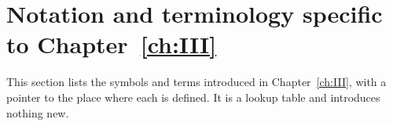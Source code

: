\endgroup
\begingroup
\providecommand{\A}{}\renewcommand{\A}{\mathbb A}
\providecommand{\C}{}\renewcommand{\C}{\mathbb C}
\providecommand{\Z}{}\renewcommand{\Z}{\mathbb Z}
\providecommand{\GL}{}\renewcommand{\GL}{\operatorname{GL}}
\providecommand{\Nrd}{}\renewcommand{\Nrd}{\operatorname{Nrd}}
\providecommand{\Irr}{}\renewcommand{\Irr}{\operatorname{Irr}}
\providecommand{\vol}{}\renewcommand{\vol}{\operatorname{vol}}
\providecommand{\tH}{}\renewcommand{\tH}{\widetilde H}
\providecommand{\tZ}{}\renewcommand{\tZ}{\widetilde Z}
\providecommand{\ttT}{}\renewcommand{\ttT}{\widetilde T}
\providecommand{\reg}{}\renewcommand{\reg}{\mathrm{reg}}
\providecommand{\gen}{}\renewcommand{\gen}{\mathrm{gen}}
\providecommand{\JL}{}\renewcommand{\JL}{\mathrm{JL}}
\providecommand{\Sha}{}\renewcommand{\Sha}{\operatorname{Sha}}
\providecommand{\Gb}{}\renewcommand{\Gb}{\overline{G}}
\providecommand{\GDb}{}\renewcommand{\GDb}{\overline{G}_D}
\providecommand{\Zb}{}\renewcommand{\Zb}{\overline{Z}}
\providecommand{\Ptag}{}\renewcommand{\Ptag}{\textnormal{\textbf{(P)}}}
\providecommand{\Etag}{}\renewcommand{\Etag}{\textnormal{\textbf{(E)}}}
\providecommand{\Otag}{}\renewcommand{\Otag}{\textnormal{\textbf{(O)}}}
\providecommand{\Ctag}{}\renewcommand{\Ctag}{\textnormal{\textbf{(C)}}}
\section{Notation and terminology specific to \texorpdfstring{Chapter~\ref{ch:III}}{Chapter 6}}\label{III:subsec:glossIII}
This section lists the symbols and terms introduced in Chapter~\ref{ch:III}, with a pointer to the place where each is defined. It is a lookup table and introduces nothing new.

